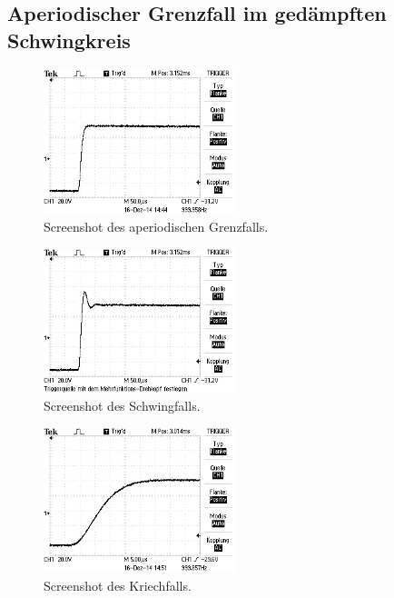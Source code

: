 \subsection{Aperiodischer Grenzfall im gedämpften Schwingkreis}
\begin{figure}[h]
		\centering
		\includegraphics[width=0.5\textwidth]{Bilder/Aperiodischer.JPG}
		\caption{Screenshot des aperiodischen Grenzfalls.}
\end{figure}

\begin{figure}[h]
		\centering
		\includegraphics[width=0.5\textwidth]{Bilder/Schwingfall.JPG}
		\caption{Screenshot des Schwingfalls.}
\end{figure}
\begin{figure}[h]
		\centering
		\includegraphics[width=0.5\textwidth]{Bilder/Kriechfall1.JPG}
		\caption{Screenshot des Kriechfalls.}
\end{figure}

